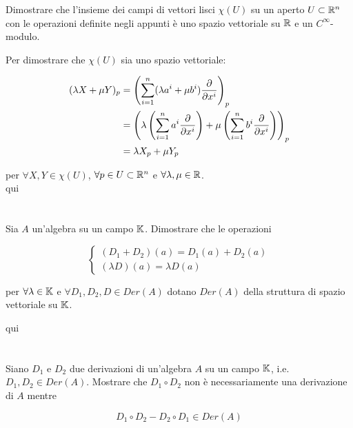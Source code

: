 \begin{tcolorbox}
	Dimostrare che l'insieme dei campi di vettori lisci $ \chi(U) $ su un aperto $ U \subset \mathbb{R}^{n} $ con le operazioni definite negli appunti è uno spazio vettoriale su $ \mathbb{R} $ e un $ C^{\infty} $-modulo.
\end{tcolorbox}

Per dimostrare che $ \chi(U) $ sia uno spazio vettoriale:

\begin{align}
	\begin{split}
		(\lambda X + \mu Y)_{p} &= \left( \sum_{i=1}^{n} (\lambda a^{i} + \mu b^{i}) \pdv{x^{i}} \right)_{p}\\
		&= \left( \lambda \left( \sum_{i=1}^{n} a^{i} \pdv{x^{i}} \right) + \mu \left( \sum_{i=1}^{n} b^{i} \pdv{x^{i}} \right) \right)_{p}\\
		&= \lambda X_{p} + \mu Y_{p}
	\end{split}
\end{align}

per $ \forall X,Y \in \chi(U) $, $ \forall p \in U \subset \mathbb{R}^{n} $ e $ \forall \lambda,\mu \in \mathbb{R} $.\\
qui

\tocless\section{}\label{es1-10}

\begin{tcolorbox}
	Sia $ A $ un'algebra su un campo $ \mathbb{K} $. Dimostrare che le operazioni
	
	\begin{equation}
		\begin{cases}
			(D_{1}+D_{2})(a) = D_{1}(a) + D_{2}(a)\\
			(\lambda D)(a) = \lambda D(a)
		\end{cases}
	\end{equation}
	
	per $ \forall \lambda \in \mathbb{K} $ e $ \forall D_{1},D_{2},D \in Der(A) $ dotano $ Der(A) $ della struttura di spazio vettoriale su $ \mathbb{K} $.
\end{tcolorbox}

qui

\tocless\section{}\label{es1-11}

\begin{tcolorbox}
	Siano $ D_{1} $ e $ D_{2} $ due derivazioni di un'algebra $ A $ su un campo $ \mathbb{K} $, i.e. $ D_{1},D_{2} \in Der(A) $. Mostrare che $ D_{1} \circ D_{2} $ non è necessariamente una derivazione di $ A $ mentre
	
	\begin{equation}
		D_{1} \circ D_{2} - D_{2} \circ D_{1} \in Der(A)
	\end{equation}
\end{tcolorbox}

